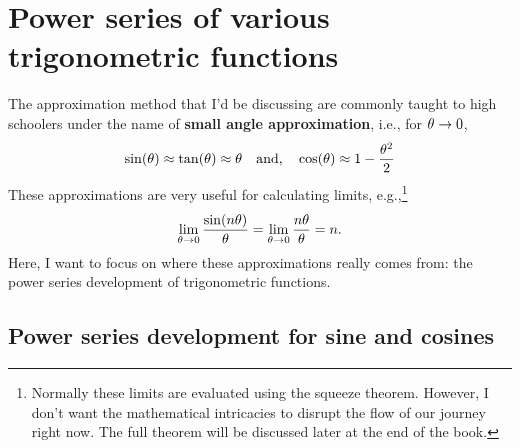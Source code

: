 \section{Power series of various trigonometric functions}

The approximation method that I'd be discussing are commonly taught to high schoolers under the name of \textbf{small angle approximation}, i.e., for $\theta \rightarrow 0$, 
\begin{gather}
    \sin(\theta) \approx \tan(\theta) \approx \theta \quad\textrm{and,}\quad \cos(\theta) \approx 1 - \frac{\theta^2}{2}
\end{gather}
These approximations are very useful for calculating limits, e.g.,\footnote{Normally these limits are evaluated using the squeeze theorem. However, I don't want the mathematical intricacies to disrupt the flow of our journey right now. The full theorem will be discussed later at the end of the book.}
\begin{equation}
    \lim_{\theta \rightarrow 0}\frac{\sin(n\theta)}{\theta} = \lim_{\theta \rightarrow 0}\frac{n\theta}{\theta} = n.
\end{equation}
Here, I want to focus on where these approximations really comes from: the power series development of trigonometric functions.

\subsection{Power series development for sine and cosines}
\label{sec:sine_cosine_power_series}

